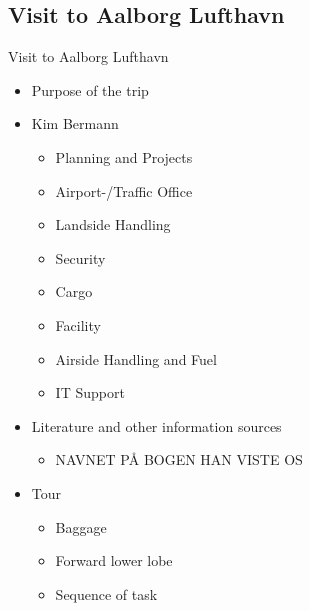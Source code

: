 \subsection{Visit to Aalborg Lufthavn}
\begin{frame}{Visit to Aalborg Lufthavn}{}
	\begin{itemize}
\item Purpose of the trip
\item Kim Bermann
\begin{itemize}
	\item Planning and Projects
	\item Airport-/Traffic Office
	\item Landside Handling
	\item Security
	\item Cargo
	\item Facility
	\item Airside Handling and Fuel
	\item IT Support
\end{itemize}
\item Literature and other information sources
\begin{itemize}
	\item NAVNET PÅ BOGEN HAN VISTE OS
\end{itemize}
\item Tour
\begin{itemize}
	\item Baggage 
	\item Forward lower lobe
	\item Sequence of task
\end{itemize}
\end{itemize}
\end{frame}

